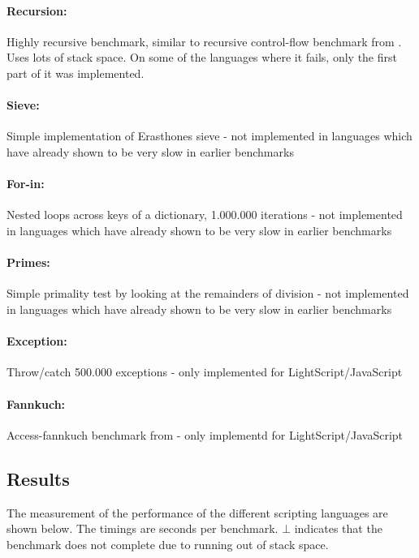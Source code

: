 \documentclass[11pt]{report}
\begin{document}
\paragraph{Recursion:} Highly recursive benchmark, similar to recursive control-flow benchmark from \cite{sunspider, shootout}. Uses lots of stack space. On some of the languages where it fails, only the first part of it was implemented.
\paragraph{Sieve:} Simple implementation of Erasthones sieve - not implemented in languages which have already shown to be very slow in earlier benchmarks
\paragraph{For-in:} Nested loops across keys of a dictionary, 1.000.000 iterations - not implemented in languages which have already shown to be very slow in earlier benchmarks
\paragraph{Primes:} Simple primality test by looking at the remainders of division - not implemented in languages which have already shown to be very slow in earlier benchmarks
\paragraph{Exception:} Throw/catch 500.000 exceptions - only implemented for LightScript/JavaScript
\paragraph{Fannkuch:} Access-fannkuch benchmark from \cite{sunspider, shootout} - only implementd for LightScript/JavaScript

\subsection{Results}
The measurement of the performance of the different scripting languages are shown below. The timings are seconds per benchmark. $\bot$ indicates that the benchmark does not complete due to running out of stack space.
\end{document}
